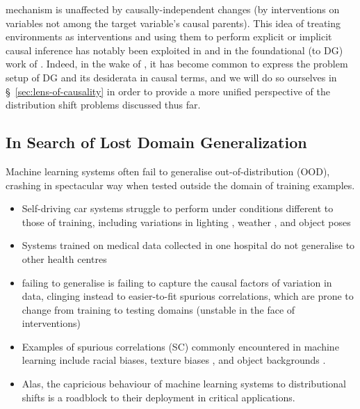 mechanism is unaffected by causally-independent changes (by interventions on variables not among
the target variable's causal parents).
%
This idea of treating environments as interventions and using them to perform explicit or implicit
causal inference has notably been exploited in \cite{peters2016causal} and in the foundational (to
DG) work of \cite{arjovsky2019invariant}.
%
Indeed, in the wake of \cite{arjovsky2019invariant}, it has become common \citep{
gulrajani2020search, krueger2021out, mahajan2021domain, lin2022zin} to express the problem setup of
DG and its desiderata in causal terms, and we will do so ourselves in
\S~\ref{sec:lens-of-causality} in order to provide a more unified perspective of the distribution
shift problems discussed thus far.

\subsection{In Search of Lost Domain Generalization \citep{gulrajani2020search}}
%
Machine learning systems often fail to generalise out-of-distribution (OOD), crashing in 
spectacular way when tested outside the domain of training examples.

\itemi\begin{itemize}
  \item Self-driving car systems struggle to perform under conditions different to those of 
    training, including variations in lighting \citep{dai2018dark}, weather \citep{volk2019towards}, 
    and object poses \citep{alcorn2019strike}
  \item Systems trained on medical data collected in one hospital do not generalise to other health
    centres \citep{castro2020causality, albadawy2018deep}
  \item failing to generalise is failing to capture the causal factors of variation in data, 
    clinging instead to easier-to-fit spurious correlations, which are prone to change from 
    training to testing domains (unstable in the face of interventions)
  \item  Examples of spurious correlations (SC) commonly encountered in machine learning include 
    racial biases, texture biases \citep{geirhos2018imagenet}, and object backgrounds
    \citep{beery2018recognition} .
  \item Alas, the capricious behaviour of machine learning systems to distributional shifts is a 
    roadblock to their deployment in critical applications.
\end{itemize}

